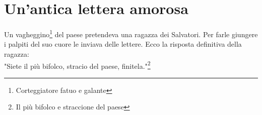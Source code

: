 
\chapter{Un'antica lettera amorosa}
Un vagheggino\footnote{Corteggiatore fatuo e galante} del paese pretendeva una ragazza dei Salvatori. Per farle giungere i palpiti del suo cuore le inviava delle lettere. Ecco la risposta definitiva della ragazza:
\\ "Siete il più bifolco, stracio del paese, finitela."\footnote{Il più bifolco e straccione del paese} 
